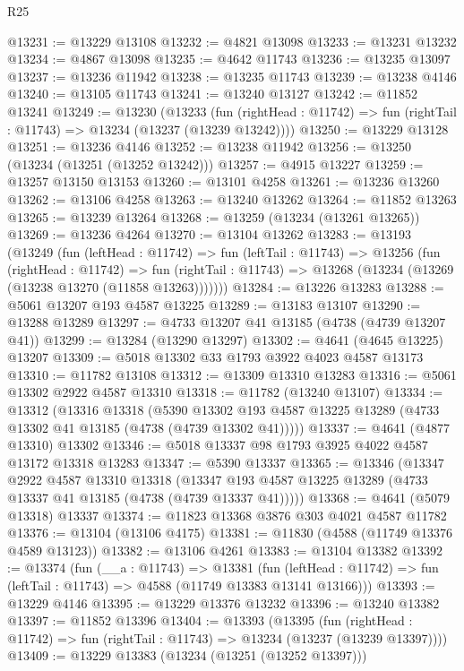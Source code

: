 \begin{lexlean}{R25}
\begin{coremodule}
@13231 := @13229 @13108
@13232 := @4821 @13098
@13233 := @13231 @13232
@13234 := @4867 @13098
@13235 := @4642 @11743
@13236 := @13235 @13097
@13237 := @13236 @11942
@13238 := @13235 @11743
@13239 := @13238 @4146
@13240 := @13105 @11743
@13241 := @13240 @13127
@13242 := @11852 @13241
@13249 := @13230
    (@13233
      (fun (rightHead : @11742) => fun (rightTail : @11743) => @13234 (@13237 (@13239 @13242))))
@13250 := @13229 @13128
@13251 := @13236 @4146
@13252 := @13238 @11942
@13256 := @13250 (@13234 (@13251 (@13252 @13242)))
@13257 := @4915 @13227
@13259 := @13257 @13150 @13153
@13260 := @13101 @4258
@13261 := @13236 @13260
@13262 := @13106 @4258
@13263 := @13240 @13262
@13264 := @11852 @13263
@13265 := @13239 @13264
@13268 := @13259 (@13234 (@13261 @13265))
@13269 := @13236 @4264
@13270 := @13104 @13262
@13283 := @13193
    (@13249
      (fun (leftHead : @11742) =>
      fun (leftTail : @11743) =>
      @13256
        (fun (rightHead : @11742) =>
        fun (rightTail : @11743) => @13268 (@13234 (@13269 (@13238 @13270 (@11858 @13263)))))))
@13284 := @13226 @13283
@13288 := @5061 @13207 @193 @4587 @13225
@13289 := @13183 @13107
@13290 := @13288 @13289
@13297 := @4733 @13207 @41 @13185 (@4738 (@4739 @13207 @41))
@13299 := @13284 (@13290 @13297)
@13302 := @4641 (@4645 @13225) @13207
@13309 := @5018 @13302 @33 @1793 @3922 @4023 @4587 @13173
@13310 := @11782 @13108
@13312 := @13309 @13310 @13283
@13316 := @5061 @13302 @2922 @4587 @13310
@13318 := @11782 (@13240 @13107)
@13334 := @13312
    (@13316
      @13318
      (@5390 @13302 @193 @4587 @13225 @13289 (@4733 @13302 @41 @13185 (@4738 (@4739 @13302 @41)))))
@13337 := @4641 (@4877 @13310) @13302
@13346 := @5018 @13337 @98 @1793 @3925 @4022 @4587 @13172 @13318 @13283
@13347 := @5390 @13337
@13365 := @13346
    (@13347
      @2922
      @4587
      @13310
      @13318
      (@13347 @193 @4587 @13225 @13289 (@4733 @13337 @41 @13185 (@4738 (@4739 @13337 @41)))))
@13368 := @4641 (@5079 @13318) @13337
@13374 := @11823 @13368 @3876 @303 @4021 @4587 @11782
@13376 := @13104 (@13106 @4175)
@13381 := @11830 (@4588 (@11749 @13376 @4589 @13123))
@13382 := @13106 @4261
@13383 := @13104 @13382
@13392 := @13374
    (fun (__a : @11743) =>
    @13381
      (fun (leftHead : @11742) => fun (leftTail : @11743) => @4588 (@11749 @13383 @13141 @13166)))
@13393 := @13229 @4146
@13395 := @13229 @13376 @13232
@13396 := @13240 @13382
@13397 := @11852 @13396
@13404 := @13393
    (@13395
      (fun (rightHead : @11742) => fun (rightTail : @11743) => @13234 (@13237 (@13239 @13397))))
@13409 := @13229 @13383 (@13234 (@13251 (@13252 @13397)))

\end{coremodule}
\end{lexlean}
